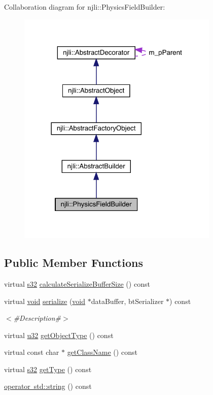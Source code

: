 Collaboration diagram for njli\+:\+:Physics\+Field\+Builder\+:\nopagebreak
\begin{figure}[H]
\begin{center}
\leavevmode
\includegraphics[width=273pt]{classnjli_1_1_physics_field_builder__coll__graph}
\end{center}
\end{figure}
\subsection*{Public Member Functions}
\begin{DoxyCompactItemize}
\item 
virtual \mbox{\hyperlink{_util_8h_aa62c75d314a0d1f37f79c4b73b2292e2}{s32}} \mbox{\hyperlink{classnjli_1_1_physics_field_builder_a7cb860ec3583ac63ecfae95a53492373}{calculate\+Serialize\+Buffer\+Size}} () const
\item 
virtual \mbox{\hyperlink{_thread_8h_af1e856da2e658414cb2456cb6f7ebc66}{void}} \mbox{\hyperlink{classnjli_1_1_physics_field_builder_a71f853a857bc30b68444f69b9bc9936d}{serialize}} (\mbox{\hyperlink{_thread_8h_af1e856da2e658414cb2456cb6f7ebc66}{void}} $\ast$data\+Buffer, bt\+Serializer $\ast$) const
\begin{DoxyCompactList}\small\item\em $<$\#\+Description\#$>$ \end{DoxyCompactList}\item 
virtual \mbox{\hyperlink{_util_8h_a10e94b422ef0c20dcdec20d31a1f5049}{u32}} \mbox{\hyperlink{classnjli_1_1_physics_field_builder_ad4016d00bc62ec1270754dde5b31d835}{get\+Object\+Type}} () const
\item 
virtual const char $\ast$ \mbox{\hyperlink{classnjli_1_1_physics_field_builder_ab9d6b3a93b3e8e05ae0cdf325c2d29f5}{get\+Class\+Name}} () const
\item 
virtual \mbox{\hyperlink{_util_8h_aa62c75d314a0d1f37f79c4b73b2292e2}{s32}} \mbox{\hyperlink{classnjli_1_1_physics_field_builder_a241d709c0cb9ed68efe50c915a58975f}{get\+Type}} () const
\item 
\mbox{\hyperlink{classnjli_1_1_physics_field_builder_abffc04fc136536f947b076b86715c4b5}{operator std\+::string}} () const
\end{DoxyCompactItemize}
